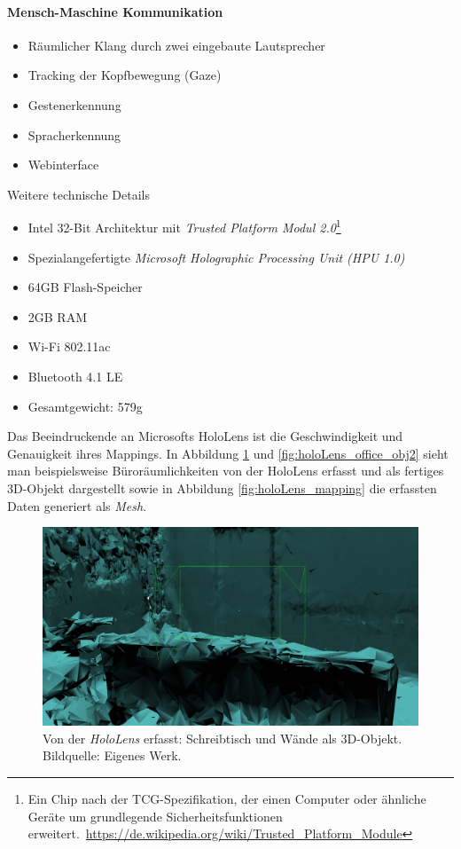 \paragraph*{Mensch-Maschine Kommunikation}
\begin{itemize}
	\item Räumlicher Klang durch zwei eingebaute Lautsprecher
	\item Tracking der Kopfbewegung (Gaze)
	\item Gestenerkennung
	\item Spracherkennung
	\item Webinterface
\end{itemize}
Weitere technische Details
\begin{itemize}
	\item Intel 32-Bit Architektur mit \textit{Trusted Platform Modul 2.0}\footnote{ Ein Chip nach der TCG-Spezifikation, der einen Computer oder ähnliche Geräte um grundlegende Sicherheitsfunktionen erweitert.\ \url{https://de.wikipedia.org/wiki/Trusted_Platform_Module}}
	\item Spezialangefertigte \textit{Microsoft Holographic Processing Unit (HPU 1.0)}
	\item 64GB Flash-Speicher
	\item 2GB RAM
	\item Wi-Fi 802.11ac
	\item Bluetooth 4.1 LE
	\item Gesamtgewicht: 579g 
\end{itemize}
Das Beeindruckende an Microsofts HoloLens ist die Geschwindigkeit und Genauigkeit ihres \frqq Mappings\flqq. In Abbildung \ref{fig:holoLens_office_obj1} und \ref{fig:holoLens_office_obj2} sieht man beispielsweise Büroräumlichkeiten von der HoloLens erfasst und als fertiges 3D-Objekt dargestellt sowie in Abbildung \ref{fig:holoLens_mapping} die erfassten Daten generiert als \textit{Mesh}.
\begin{figure}[ht]
	\centering
	\includegraphics[width=.75\textwidth]{figuren/HoloLens_office1}
	\caption{Von der \textit{HoloLens} erfasst: Schreibtisch und Wände als 3D-Objekt. Bildquelle: Eigenes Werk.}
	\label{fig:holoLens_office_obj1}
\end{figure}
